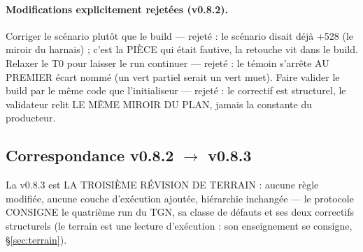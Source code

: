 \paragraph{Modifications explicitement rejetées (v0.8.2).} Corriger le
scénario plutôt que le build — rejeté : le scénario disait déjà +528 (le
miroir du harnais) ; c'est la PIÈCE qui était fautive, la retouche vit dans
le build. Relaxer le T0 pour laisser le run continuer — rejeté : le témoin
s'arrête AU PREMIER écart nommé (un vert partiel serait un vert muet). Faire
valider le build par le même code que l'initialiseur — rejeté : le correctif
est structurel, le validateur relit LE MÊME MIROIR DU PLAN, jamais la
constante du producteur.

\subsection{Correspondance v0.8.2 $\to$ v0.8.3}\label{sec:evolutions083}

La v0.8.3 est LA TROISIÈME RÉVISION DE TERRAIN : aucune règle modifiée, aucune
couche d'exécution ajoutée, hiérarchie inchangée — le protocole CONSIGNE le
quatrième run du TGN, sa classe de défauts et ses deux correctifs structurels
(le terrain est une lecture d'exécution : son enseignement se consigne,
§\ref{sec:terrain}).


